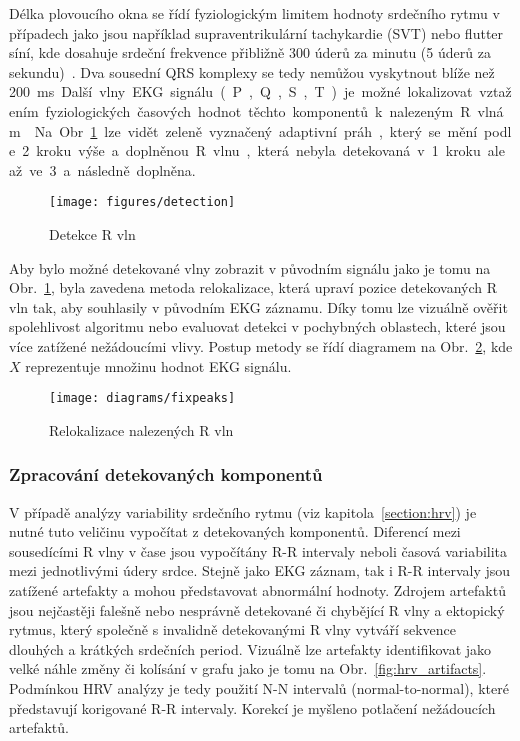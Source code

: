 Délka plovoucího okna se řídí fyziologickým limitem hodnoty srdečního rytmu v
případech jako jsou například supraventrikulární tachykardie (SVT) nebo flutter
síní, kde dosahuje srdeční frekvence přibližně 300 úderů za minutu (5 úderů za
sekundu)~\cite{Haberl2012,Goldberger2017}. Dva sousední QRS komplexy se tedy
nemůžou vyskytnout blíže než 200~\si\ms.

Další vlny EKG signálu (P, Q, S, T) je možné lokalizovat vztažením
fyziologických časových hodnot těchto komponentů k nalezeným R
vlnám~\cite{Nabian2018}. Na Obr.~\ref{fig:detection} lze vidět zeleně vyznačený
adaptivní práh, který se mění podle 2. kroku výše a doplněnou R vlnu, která
nebyla detekovaná v 1. kroku ale až ve 3. a následně doplněna.

\begin{figure}[h]
    \begin{center}
        \texttt{[image: figures/detection]}
        \caption{Detekce R vln}
        \label{fig:detection}
    \end{center}
\end{figure}

Aby bylo možné detekované vlny zobrazit v původním signálu jako je tomu na
Obr.~\ref{fig:detection}, byla zavedena metoda relokalizace, která upraví pozice
detekovaných R vln tak, aby souhlasily v původním EKG záznamu. Díky tomu lze
vizuálně ověřit spolehlivost algoritmu nebo evaluovat detekci v pochybných
oblastech, které jsou více zatížené nežádoucími vlivy. Postup metody se řídí
diagramem na Obr.~\ref{fig:fixpeaks}, kde $X$ reprezentuje množinu hodnot EKG
signálu.

\begin{figure}[h]
    \begin{center}
        \texttt{[image: diagrams/fixpeaks]}
        \caption{Relokalizace nalezených R vln}
        \label{fig:fixpeaks}
    \end{center}
\end{figure}

\subsubsection{Zpracování detekovaných komponentů}
\label{section:components_processing}
V případě analýzy variability srdečního rytmu (viz kapitola~\ref{section:hrv})
je nutné tuto veličinu vypočítat z detekovaných komponentů. Diferencí mezi
sousedícími R vlny v čase jsou vypočítány R-R intervaly neboli časová
variabilita mezi jednotlivými údery srdce. Stejně jako EKG záznam, tak i R-R
intervaly jsou zatížené artefakty a mohou představovat abnormální hodnoty.
Zdrojem artefaktů jsou nejčastěji falešně nebo nesprávně detekované či chybějící
R vlny a ektopický rytmus, který společně s invalidně detekovanými R vlny
vytváří sekvence dlouhých a krátkých srdečních period. Vizuálně lze artefakty
identifikovat jako velké náhle změny či kolísání v grafu jako je tomu na
Obr.~\ref{fig:hrv_artifacts}. Podmínkou HRV analýzy je tedy použití N-N
intervalů (normal-to-normal), které představují korigované R-R intervaly.
Korekcí je myšleno potlačení nežádoucích artefaktů.


